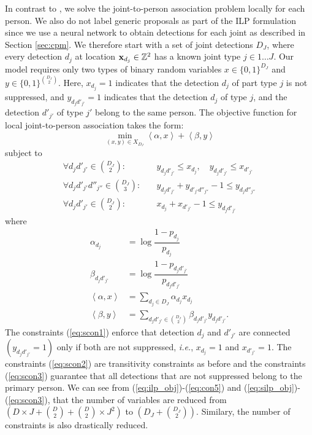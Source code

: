 \documentclass[runningheads]{llncs}
\newcommand{\ie}{\mbox{\emph{i.e.}}}
\begin{document}
In contrast to \cite{pishchulin2015deepcut}, we solve the joint-to-person association problem locally for each person. We also do not label generic proposals as part of the ILP formulation since we use a neural network to obtain detections for each joint as described in Section \ref{sec:cpm}.
We therefore start with a set of joint detections $D_J$, where every detection $d_j$ at location $\bold{x}_{d_j} \in \mathbb{Z}^2$ has a known joint type $j \in {1 \dots J}$. Our model requires only two types of binary random variables $x \in \{0,1\}^{D_J}$ and  $y \in \{0,1\}^{\binom {D_J}{2}}$. Here, $x_{d_j} = 1$ indicates that the detection $d_j$ of part type $j$ is not suppressed, and  $y_{{d_j}{{d'}_{j'}}} = 1$ indicates that the detection $d_j$ of type $j$, and the detection ${d'}_{j'}$ of type $j'$ belong to the same person. The objective function for local joint-to-person association takes the form: \begin{equation}
\min_{(x,y) \in X_{D_J}} \left\langle \alpha, x \right\rangle + \left\langle \beta, y \right\rangle \label{eq:silp_obj}
\end{equation}
subject to
\begin{align}
\forall {d_j}{{d'}_{j'}} \in \binom {D_J}{2} :& \quad y_{{d_j}{{d'}_{j'}}} \leq x_{d_j}, \quad y_{{d_j}{{d'}_{j'}}} \leq x_{d'_{j'}} \label{eq:scon1} \\
\forall {d_j}{d'_{j'}}{d''_{j''}} \in \binom {D_J}{3} :& \quad y_{{d_j}{d'_{j'}}} + y_{{d'_{j'}}{d''_{j''}}} - 1 \leq y_{{d_j}{{d''}_{j''}}} \label{eq:scon2}\\
\forall {d_j}{d'_{j'}} \in \binom {D_J}{2} :& \quad x_{d_j} + x_{d'_{j'}} -1 \leq y_{{d_j}{{d'}_{j'}}} \label{eq:scon3}
\end{align}
where 
\begin{align}
\alpha_{d_j} &= \log \dfrac{1-p_{d_j}}{p_{d_j}} \label{eq:sunary} \\
\beta_{{d_j}{d'_{j'}}} &= \log \dfrac{1-p_{{d_j}{d'_{j'}}}}{p_{{d_j}{d'_{j'}}}} \label{eq:sbinary} \\
\left\langle \alpha, x \right\rangle &= \sum_{d_j \in D_J} \alpha_{d_j} x_{d_j} \\
\left\langle \beta, y \right\rangle &= \sum_{{d_j}{d'_{j'}} \in \binom {D_J}{2}} \beta_{{d_j}{d'_{j'}}} y_{{d_j}{d'_{j'}}}.
\end{align}
The constraints (\ref{eq:scon1}) enforce that detection $d_j$ and ${d'_{j'}}$ are connected $(y_{{d_j}{{d'}_{j'}}} = 1)$ only if both are not suppressed, \ie, $x_{d_j} = 1$ and $x_{d'_{j'}} = 1$. The constraints (\ref{eq:scon2}) are transitivity constraints as before and the constraints (\ref{eq:scon3}) guarantee that all detections that are not suppressed belong to the primary person. We can see from (\ref{eq:ilp_obj})-(\ref{eq:con5}) and (\ref{eq:silp_obj})-(\ref{eq:scon3}), that the number of variables are reduced from $({D \times J}+{\binom D2}+{\binom D2 \times J^2})$ to $({D_J}+{\binom {D_J}{2}})$. Similary, the number of constraints is also drastically reduced.  
\end{document}
